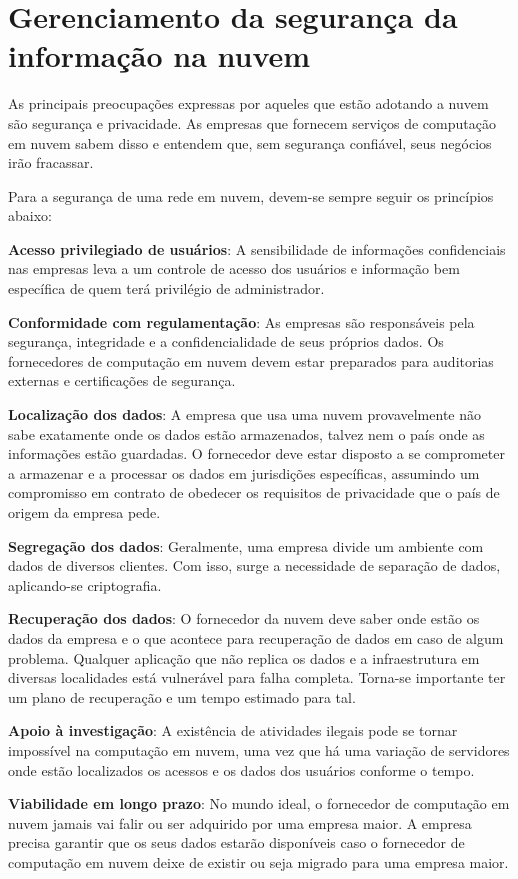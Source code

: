 \section{Gerenciamento da segurança da informação na nuvem}

As principais preocupações expressas por aqueles que estão adotando a nuvem são
segurança e privacidade. As empresas que fornecem serviços de computação em nuvem
sabem disso e entendem que, sem segurança confiável, seus negócios irão
fracassar.

Para a segurança de uma rede em nuvem, devem-se sempre seguir os princípios abaixo:

\newcommand{\itemm}[1]{\item\textbf{#1}}

\begin{itemise}

    \itemm{Acesso privilegiado de usuários}: A sensibilidade de informações
    confidenciais nas empresas leva a um controle de acesso dos usuários e
    informação bem específica de quem terá privilégio de administrador.
    
    \itemm{Conformidade com regulamentação}: As empresas são responsáveis pela
    segurança, integridade e a confidencialidade de seus próprios dados. Os
    fornecedores de computação em nuvem devem estar preparados para auditorias
    externas e certificações de segurança.
    
    \itemm{Localização dos dados}: A empresa que usa uma nuvem provavelmente não
    sabe exatamente onde os dados estão armazenados, talvez nem o país onde as
    informações estão guardadas. O fornecedor deve estar disposto a se comprometer a
    armazenar e a processar os dados em jurisdições específicas, assumindo um
    compromisso em contrato de obedecer os requisitos de privacidade que o país de
    origem da empresa pede.
    
    \itemm{Segregação dos dados}: Geralmente, uma empresa divide um ambiente com
    dados de diversos clientes. Com isso, surge a necessidade de separação de dados,
    aplicando-se criptografia.
    
    \itemm{Recuperação dos dados}: O fornecedor da nuvem deve saber onde estão os
    dados da empresa e o que acontece para recuperação de dados em caso de algum
    problema. Qualquer aplicação que não replica os dados e a infraestrutura em 
    diversas localidades está vulnerável para falha completa. Torna-se importante
    ter um plano de recuperação e um tempo estimado para tal.
    
    \itemm{Apoio à investigação}: A existência de atividades ilegais pode se tornar
    impossível na computação em nuvem, uma vez que há uma variação de servidores
    onde estão localizados os acessos e os dados dos usuários conforme o tempo.
    
    \itemm{Viabilidade em longo prazo}: No mundo ideal, o fornecedor de computação
    em nuvem jamais vai falir ou ser adquirido por uma empresa maior. A empresa
    precisa garantir que os seus dados estarão disponíveis caso o fornecedor de
    computação em nuvem deixe de existir ou seja migrado para uma empresa maior.

\end{itemise}

